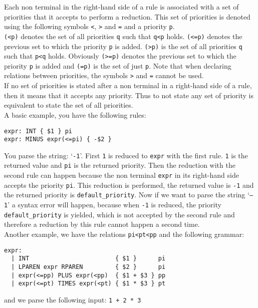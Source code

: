 \documentclass[12pt]{article}
\begin{document}
{Each non terminal in the right-hand side of a rule is associated with a set of priorities that it accepts to perform a reduction. This set of priorities is denoted using the following symbols \texttt{<}, \texttt{>} and \texttt{=} and a priority \texttt{p}.\\

\texttt{(<p)} denotes the set of all priorities \texttt{q} such that \texttt{q<p} holds. \texttt{(<=p)} denotes the previous set to which the priority \texttt{p} is added. \texttt{(>p)} is the set of all priorities \texttt{q} such that \texttt{p<q} holds. Obviously \texttt{(>=p)} denotes the previous set to which the priority \texttt{p} is added and \texttt{(=p)} is the set of just \texttt{p}. Note that when declaring relations between priorities, the symbols \texttt{>} and \texttt{=} cannot be used.\\

If no set of priorities is stated after a non terminal in a right-hand side of a rule, then it means that it accepts any priority. Thus to not state any set of priority is equivalent to state the set of all priorities.\\

A basic example, you have the following rules:
\begin{verbatim}
expr: INT { $1 } pi
expr: MINUS expr(<=pi) { -$2 }
\end{verbatim}
You parse the string: `\texttt{-1}'. First \texttt{1} is reduced to \texttt{expr} with the first rule. \texttt{1} is the returned value and \texttt{pi} is the returned priority. Then the reduction with the second rule can happen because the non terminal \texttt{expr} in its right-hand side accepts the priority \texttt{pi}. This reduction is performed, the returned value is \texttt{-1} and the returned priority is \texttt{default\_priority}. Now if we want to parse the string `\texttt{--1}' a syntax error will happen, because when \texttt{-1} is reduced, the priority \texttt{default\_priority} is yielded, which is not accepted by the second rule and therefore a reduction by this rule cannot happen a second time.\\

Another example, we have the relations \texttt{pi<pt<pp} and the following grammar:
\begin{verbatim}
expr:
  | INT                        { $1 }      pi
  | LPAREN expr RPAREN         { $2 }      pi
  | expr(<=pp) PLUS expr(<pp)  { $1 + $3 } pp
  | expr(<=pt) TIMES expr(<pt) { $1 * $3 } pt
\end{verbatim}
and we parse the following input: \texttt{1 + 2 * 3}\\

}
\end{document}
